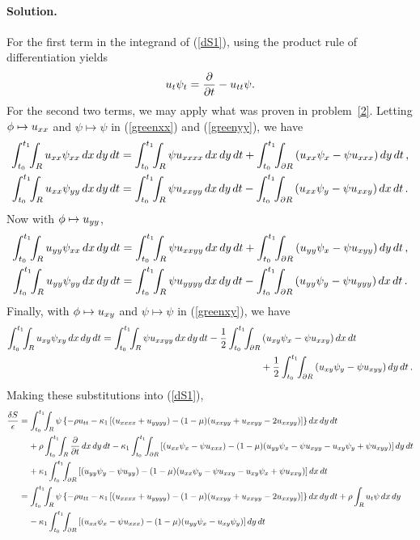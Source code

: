 \documentclass[11pt]{article}
\newcommand{\refeq}[1]{(\ref{#1})}
\newcommand{\beq}{\begin{equation*}}
\newcommand{\eeq}{\end{equation*}}
\newenvironment{solution}
{
    \paragraph{Solution.}
    \ignorespaces
}
{
}
\begin{document}
\begin{solution}
	For the first term in the integrand of \refeq{dS1}, using the product rule of differentiation yields
	\beq
		\ut \psit = \pdv{}{t} (\ut \psi) - \utt \psi.
	\eeq
	For the second two terms, we may apply what was proven in problem~\ref{2}.  Letting $\phi \mapsto u_{xx}$ and $\psi \mapsto \psi$ in \refeq{greenxx} and \refeq{greenyy}, we have
	\begin{align*}
		\inttr \uxx \psixx \drt &= \inttr \psi \uxxxx \drt + \inttdr \left( \uxx \psix - \psi \uxxx \right) \dd{y} \dd{t}, \\
		\inttr \uxx \psiyy \drt &= \inttr \psi \uxxyy \drt - \inttdr \left( \uxx \psiy - \psi \uxxy \right) \dd{x} \dd{t}.
	\end{align*}
	Now with $\phi \mapsto u_{yy}$,
	\begin{align*}
		\inttr \uyy \psixx \drt &= \inttr \psi \uxxyy \drt + \inttdr \left( \uyy \psix - \psi \uxyy \right) \dd{y} \dd{t}, \\
		\inttr \uyy \psiyy \drt &= \inttr \psi \uyyyy \drt - \inttdr \left( \uyy \psiy - \psi \uyyy \right) \dd{x} \dd{t}.
	\end{align*}
	Finally, with $\phi \mapsto u_{xy}$ and $\psi \mapsto \psi$ in \refeq{greenxy}, we have
	\begin{align*}
		\inttr \uxy \psixy \drt = \inttr \psi \uxxyy \drt - \frac{1}{2} \inttdr &\left( \uxy \psix - \psi \uxxy \right) \dd{x} \dd{t} \\
		&+ \frac{1}{2} \inttdr \left( \uxy \psiy - \psi \uxyy \right) \dd{y} \dd{t}.
	\end{align*}
	Making these substitutions into \refeq{dS1},
	\begin{align*}
		\frac{\dS}{\eps} &= \inttr \psi \left\{ -\rho \utt - \kaq \left[ (\uxxxx + \uyyyy) - (1 - \mu) (\uxxyy + \uxxyy - 2 \uxxyy) \right] \right\} \drt \\
		&\phantom{=\ } + \rho \inttr \pdv{}{t} (\ut \psi) \drt - \kaq \inttdr \left[ (\uxx \psix - \psi \uxxx) - (1 - \mu) (\uyy \psix - \psi \uxyy - \uxy \psiy + \psi \uxyy) \right] \dd{y} \dd{t} \\
		&\phantom{=\ } + \kaq \inttdr \left[ (\uyy \psiy - \psi \uyy) - (1 - \mu) (\uxx \psiy - \psi \uxxy - \uxy \psix + \psi \uxxy) \right] \dd{x} \dd{t} \\
		&= \inttr \psi \left\{ -\rho \utt - \kaq \left[ (\uxxxx + \uyyyy) - (1 - \mu) (\uxxyy + \uxxyy - 2 \uxxyy) \right] \right\} \drt + \rho \intr \ut \psi \dd{x} \dd{y} \\
		&\phantom{=\ } - \kaq \inttdr \left[ (\uxx \psix - \psi \uxxx) - (1 - \mu) (\uyy \psix - \uxy \psiy) \right] \dd{y} \dd{t} \\

\end{align*}
\end{solution}
\end{document}
